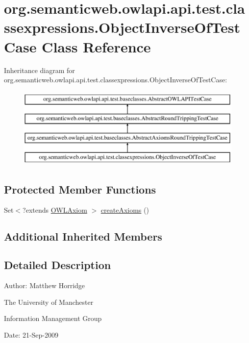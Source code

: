 \hypertarget{classorg_1_1semanticweb_1_1owlapi_1_1api_1_1test_1_1classexpressions_1_1_object_inverse_of_test_case}{\section{org.\-semanticweb.\-owlapi.\-api.\-test.\-classexpressions.\-Object\-Inverse\-Of\-Test\-Case Class Reference}
\label{classorg_1_1semanticweb_1_1owlapi_1_1api_1_1test_1_1classexpressions_1_1_object_inverse_of_test_case}
}
Inheritance diagram for org.\-semanticweb.\-owlapi.\-api.\-test.\-classexpressions.\-Object\-Inverse\-Of\-Test\-Case\-:\begin{figure}[H]
\begin{center}
\leavevmode
\includegraphics[height=4.000000cm]{classorg_1_1semanticweb_1_1owlapi_1_1api_1_1test_1_1classexpressions_1_1_object_inverse_of_test_case}
\end{center}
\end{figure}
\subsection*{Protected Member Functions}
\begin{DoxyCompactItemize}
\item 
Set$<$?extends \hyperlink{interfaceorg_1_1semanticweb_1_1owlapi_1_1model_1_1_o_w_l_axiom}{O\-W\-L\-Axiom} $>$ \hyperlink{classorg_1_1semanticweb_1_1owlapi_1_1api_1_1test_1_1classexpressions_1_1_object_inverse_of_test_case_a219194fa90888e58c17a75a64d2e4c7f}{create\-Axioms} ()
\end{DoxyCompactItemize}
\subsection*{Additional Inherited Members}


\subsection{Detailed Description}
Author\-: Matthew Horridge\par
 The University of Manchester\par
 Information Management Group\par
 Date\-: 21-\/\-Sep-\/2009 

